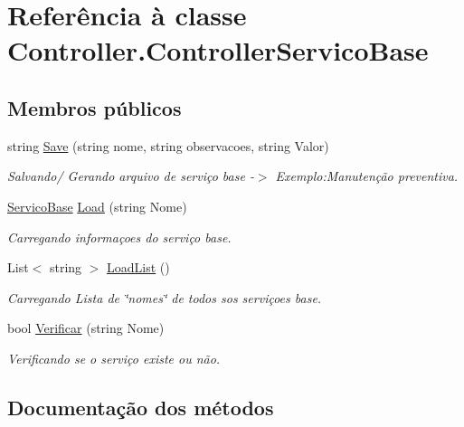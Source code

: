 \hypertarget{class_controller_1_1_controller_servico_base}{}\section{Referência à classe Controller.\+Controller\+Servico\+Base}
\label{class_controller_1_1_controller_servico_base}
\subsection*{Membros públicos}
\begin{DoxyCompactItemize}
\item 
string \hyperlink{class_controller_1_1_controller_servico_base_a6a0eeffeaa762fff9c2bf6001ebf3218}{Save} (string nome, string observacoes, string Valor)
\begin{DoxyCompactList}\small\item\em Salvando/ Gerando arquivo de serviço base -\/$>$ Exemplo\+:Manutenção preventiva. \end{DoxyCompactList}\item 
\hyperlink{class_model_1_1_servico_base}{Servico\+Base} \hyperlink{class_controller_1_1_controller_servico_base_aace590d0f94963b2c68db433a443750a}{Load} (string Nome)
\begin{DoxyCompactList}\small\item\em Carregando informaçoes do serviço base. \end{DoxyCompactList}\item 
List$<$ string $>$ \hyperlink{class_controller_1_1_controller_servico_base_a69dba6f5d7606c0fb340132543a25509}{Load\+List} ()
\begin{DoxyCompactList}\small\item\em Carregando Lista de \char`\"{}nomes\char`\"{} de todos sos serviçoes base. \end{DoxyCompactList}\item 
bool \hyperlink{class_controller_1_1_controller_servico_base_a3764ecd3d6ec0aad17b7e23ce520ce99}{Verificar} (string Nome)
\begin{DoxyCompactList}\small\item\em Verificando se o serviço existe ou não. \end{DoxyCompactList}\end{DoxyCompactItemize}


\subsection{Documentação dos métodos}
\hypertarget{class_controller_1_1_controller_servico_base_aace590d0f94963b2c68db433a443750a}{}
